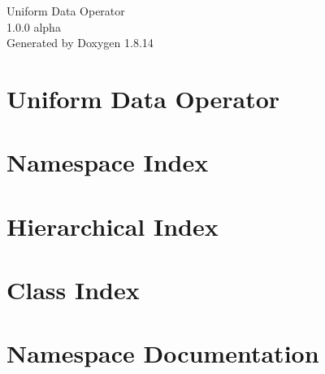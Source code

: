 \documentclass[twoside]{book}
\newcommand{\+}{\discretionary{\mbox{\scriptsize$\hookleftarrow$}}{}{}}
\newcommand{\clearemptydoublepage}{%
  \newpage{\pagestyle{empty}\cleardoublepage}%
}
\begin{document}
\hypersetup{pageanchor=false,
             bookmarksnumbered=true,
             pdfencoding=unicode
            }
\begin{titlepage}
\vspace*{7cm}
\begin{center}%
{\Large Uniform Data Operator \\[1ex]\large 1.\+0.\+0 alpha }\\
\vspace*{1cm}
{\large Generated by Doxygen 1.8.14}\\
\end{center}
\end{titlepage}
\clearemptydoublepage
{}
\tableofcontents
\clearemptydoublepage
{}
\hypersetup{pageanchor=true}

\chapter{Uniform Data Operator}
\label{md__d_1__work__git_hub_uniform-data-operator__readme}

\chapter{Namespace Index}

\chapter{Hierarchical Index}

\chapter{Class Index}

\chapter{Namespace Documentation}












\end{document}
